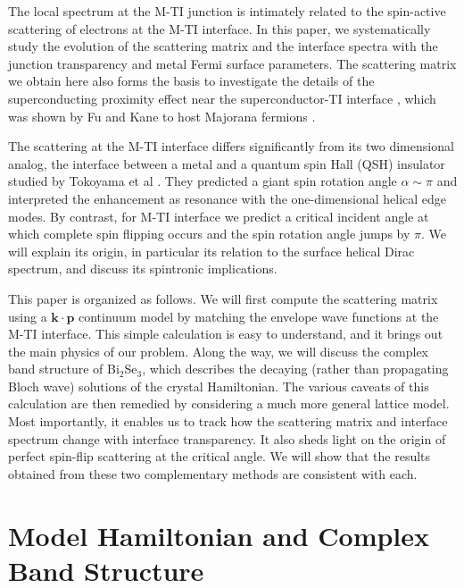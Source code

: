 \documentclass[11pt,revtex,aps]{report}
\begin{document}
The local spectrum at the M-TI junction is intimately related to the spin-active scattering of electrons at the M-TI interface. In this paper, we systematically study the evolution of the scattering matrix and the interface spectra
with the junction transparency and metal Fermi surface parameters. 
The scattering matrix \cite{mrs} we obtain here also forms the basis to investigate the details of the superconducting proximity effect near the superconductor-TI interface \cite{stan}, which was shown by Fu and Kane to host Majorana fermions \cite{majorana}.

The scattering at the M-TI interface differs significantly from its two dimensional analog, the interface between a metal and a quantum spin Hall (QSH) insulator studied by Tokoyama et al \cite{yokoyama09}. They predicted a giant spin rotation angle $\alpha\sim \pi$ and interpreted the enhancement as resonance with the one-dimensional helical edge modes. By contrast, for M-TI interface we predict a critical incident angle at which complete spin flipping occurs and the spin rotation angle jumps by $\pi$. We will explain its origin, {in particular its relation to the surface helical Dirac spectrum}, and discuss its spintronic implications.

This paper is organized as follows. 
We will first compute the scattering matrix using a $\mathbf{k\cdot p}$ continuum model 
by matching the envelope wave functions at the M-TI interface. This simple calculation is easy to understand, 
and it brings out
the main physics of our problem. Along the way, we will discuss the complex band structure of Bi$_2$Se$_3$,
 which describes the decaying (rather than propagating Bloch wave) solutions of the crystal Hamiltonian.
The various caveats of this calculation 
are then remedied by considering a much more general lattice model. Most importantly, it enables us to 
track how the scattering matrix and interface spectrum change with interface transparency. It also sheds light on
the origin of perfect spin-flip scattering at the critical angle.
We will show that the results obtained from these two complementary methods are consistent with each.

\section{Model Hamiltonian and Complex Band Structure}
\end{document}
